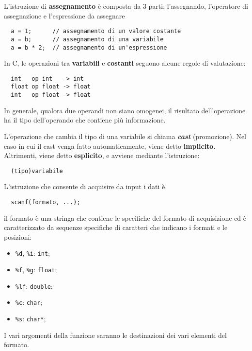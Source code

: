 L'istruzione di {\bf assegnamento} è composta da 3 parti: l'assegnando, l'operatore di assegnazione e l'espressione da assegnare
\begin{verbatim}
  a = 1;      // assegnamento di un valore costante
  a = b;      // assegnamento di una variabile
  a = b * 2;  // assegnamento di un'espressione
\end{verbatim}

In C, le operazioni tra {\bf variabili} e {\bf costanti} seguono alcune regole di valutazione:
\begin{verbatim}
  int   op int   -> int
  float op float -> float
  int   op float -> float
\end{verbatim}
In generale, qualora due operandi non siano omogenei, il risultato dell'operazione ha il tipo dell'operando che contiene più informazione.

L'operazione che cambia il tipo di una variabile si chiama \textbf{\emph{cast}} (promozione). Nel caso in cui il cast venga fatto automaticamente, viene detto \textbf{implicito}. Altrimenti, viene detto \textbf{esplicito}, e avviene mediante l'istruzione:
\begin{verbatim}
  (tipo)variabile
\end{verbatim}

L'istruzione che consente di acquisire da input i dati è
\begin{verbatim}
  scanf(formato, ...);
\end{verbatim}
il formato è una stringa che contiene le specifiche del formato di acquisizione ed è caratterizzato da sequenze specifiche di caratteri che indicano i formati e le posizioni:
\begin{itemize}
  \item \verb|%d|, \verb|%i|: \verb|int|;
  \item \verb|%f|, \verb|%g|: \verb|float|;
  \item \verb|%lf|: \verb|double|;
  \item \verb|%c|: \verb|char|;
  \item \verb|%s|: \verb|char*|;
\end{itemize}
I vari argomenti della funzione saranno le destinazioni dei vari elementi del formato.


